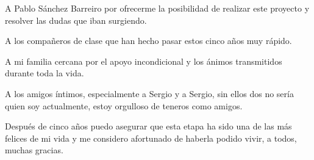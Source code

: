 

A Pablo Sánchez Barreiro por ofrecerme la posibilidad de realizar este proyecto y resolver las dudas que iban surgiendo.
\newline

A los compañeros de clase que han hecho pasar estos cinco años muy rápido.
\newline

A mi familia cercana por el apoyo incondicional y los ánimos transmitidos durante toda la vida.
\newline

A los amigos íntimos, especialmente a Sergio y a Sergio, sin ellos dos no sería quien soy actualmente, estoy orgulloso de teneros como amigos.
\newline


Después de cinco años puedo asegurar que esta etapa ha sido una de las más felices de mi vida y me considero afortunado de haberla podido vivir, a todos, muchas gracias.